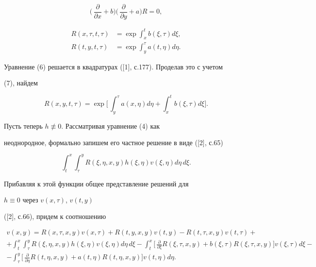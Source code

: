 \begin{equation}


\biggl(\,\frac{\partial}{\partial x}+b\biggr)


\biggl(\,\frac{\partial}{\partial y}+a\biggr)R=0,


\end{equation}


\begin{equation}


\begin{split}


R(x,\tau,t,\tau)&=\exp\int^t_x b(\xi,\tau)d\xi,\\


R(t,y,t,\tau)&=\exp\int^\tau_y a(t,\eta)d\eta.


\end{split}


\end{equation}


Уравнение (6) решается в квадратурах ([1], с.177). Проделав это с учетом


(7), найдем


\begin{equation}


R(x,y,t,\tau)=\exp\biggl[\,\int^\tau_y a(x,\eta)d\eta+


\int^t_x b(\xi,\tau)d\xi\biggr].


\end{equation}


Пусть теперь $h\not\equiv 0$. Рассматривая уравнение (4) как


неоднородное, формально запишем его частное решение в виде ([2], с.65)


$$


\int^x_t\int^y_\tau R(\xi,\eta,x,y)h(\xi,\eta)


v(\xi,\eta)d\eta\,d\xi.


$$


Прибавляя к этой функции общее представление решений для


$h\equiv 0$ через $v(x,\tau)$, $v(t,y)$


([2], с.66), придем к соотношению


\begin{gather*}


v(x,y)=R(x,\tau,x,y)v(x,\tau)+R(t,y,x,y)v(t,y)-


R(t,\tau,x,y)v(t,\tau)+\\


+\int^x_t\int^y_\tau


R(\xi,\eta,x,y)h(\xi,\eta)v(\xi,\eta)d\eta\,d\xi-


\int^x_t\biggl[\,\frac{\partial}{\partial\xi}


R(\xi,\tau,x,y)+b(\xi,\tau)R(\xi,\tau,x,y)\biggr]


v(\xi,\tau)d\xi-\\


-\int^y_\tau\biggl[\,


\frac{\partial}{\partial\eta}R(t,\eta,x,y)+a(t,\eta)


R(t,\eta,x,y)\biggr]v(t,\eta)d\eta.


\end{gather*}


